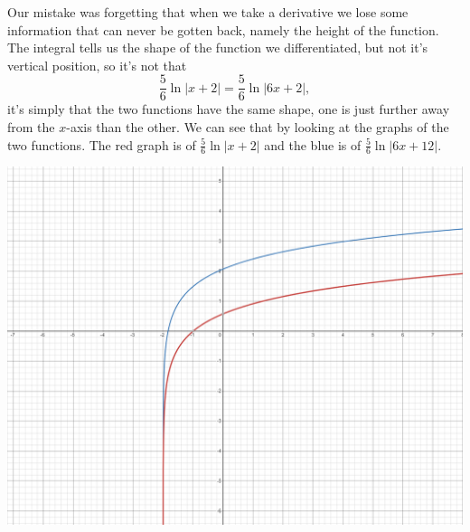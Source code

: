 \documentclass[11pt]{article}
\begin{document}
    Our mistake was forgetting that when we take a derivative we lose some information that can never be gotten back, namely the height of the function. The integral tells us the shape of the function we differentiated, but not it's vertical position, so it's not that $$\frac{5}{6}\ln|x+2|=\frac{5}{6}\ln|6x+2|,$$
    it's simply that the two functions have the same shape, one is just further away from the $x$-axis than the other. We can see that by looking at the graphs of the two functions. The red graph is of $\frac{5}{6}\ln|x+2|$ and the blue is of $\frac{5}{6}\ln|6x+12|$.
    \begin{center}
        \includegraphics[width=16cm]{F24/Misc. Notes/Halvor-notes.png}
    \end{center}
\end{document}
